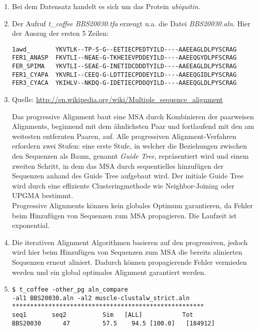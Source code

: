 \documentclass{homework}
\date{Montag, dem 12. November 2012}
\author{Stefan Meißner (4279113) und Niels Hoppe (4356370)}
\begin{document}
\maketitle
\begin{enumerate} 

\begin{enumerate}
\item Bei dem Datensatz handelt es sich um das Protein \textit{ubiquitin}.
\item Der Aufruf \textit{t\_coffee BBS20030.tfa} erzeugt u.a. die Datei \textit{BBS20030.aln}. Hier der Auszug der ersten 5 Zeilen:
\begin{verbatim}
1awd_       YKVTLK--TP-S-G--EETIECPEDTYILD----AAEEAGLDLPYSCRAG
FER1_ANASP  FKVTLI--NEAE-G-TKHEIEVPDDEYILD----AAEEQGYDLPFSCRAG
FER_SPIMA   YKVTLI--SEAE-G-INETIDCDDDTYILD----AAEEAGLDLPYSCRAG
FER1_CYAPA  YKVRLI--CEEQ-G-LDTTIECPDDEYILD----AAEEQGIDLPYSCRAG
FER3_CYACA  YKIHLV--NKDQ-G-IDETIECPDDQYILD----AAEEQGLDLPYSCRAG
\end{verbatim}
\item Quelle: \url{http://en.wikipedia.org/wiki/Multiple\_sequence\_alignment}

Das progressive Alignment baut eine MSA durch Kombinieren der paarweisen Alignments, beginnend mit dem ähnlichsten Paar und fortlaufend mit den am weitesten entfernten Paaren, auf. Alle progressiven Alignment-Verfahren erfordern zwei Stufen: eine erste Stufe, in welcher die Beziehungen zwischen den Sequenzen als Baum, genannt \textit{Guide Tree}, repräsentiert wird und einem zweiten Schritt, in dem das MSA durch sequentielles hinzufügen der Sequenzen anhand des Guide Tree aufgebaut wird. Der initiale Guide Tree wird durch eine effiziente Clusteringmethode wie Neighbor-Joining oder UPGMA bestimmt. \\
Progressive Alignments können kein globales Optimum garantieren, da Fehler beim Hinzufügen von Sequenzen zum MSA propagieren. Die Laufzeit ist exponential.

\item Die iterativen Alignment Algorithmen basieren auf den progressiven, jedoch wird hier beim Hinzufügen von Sequenzen zum MSA die bereits alinierten Sequenzen erneut aliniert. Dadurch können propagierende Fehler vermieden werden und  ein global optimales Alignment garantiert werden.

\item
\begin{verbatim}
$ t_coffee -other_pg aln_compare 
-al1 BBS20030.aln -al2 muscle-clustalw_strict.aln 
*****************************************************
seq1       seq2          Sim   [ALL]           Tot  
BBS20030      47         57.5    94.5 [100.0]   [184912]


\end{verbatim}
\end{enumerate}
\end{enumerate}
\end{document}
